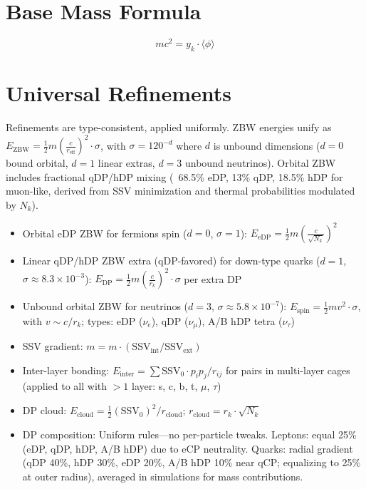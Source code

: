 \documentclass{article}
\begin{document}
\section{Base Mass Formula}

\[
m c^2 = y_k \cdot \langle\phi\rangle
\]

\section{Universal Refinements}

Refinements are type-consistent, applied uniformly. ZBW energies unify as $E_{\text{ZBW}} = \frac{1}{2} m \left( \frac{c}{r_{\text{eff}}} \right)^2 \cdot \sigma$, with $\sigma = 120^{-d}$ where $d$ is unbound dimensions ($d=0$ bound orbital, $d=1$ linear extras, $d=3$ unbound neutrinos). Orbital ZBW includes fractional qDP/hDP mixing (~68.5\% eDP, 13\% qDP, 18.5\% hDP for muon-like, derived from SSV minimization and thermal probabilities modulated by $N_k$).
\begin{itemize}
\item Orbital eDP ZBW for fermions spin ($d=0$, $\sigma=1$): $E_{\text{eDP}} = \frac{1}{2} m \left( \frac{c}{\sqrt{N_k}} \right)^2$
\item Linear qDP/hDP ZBW extra (qDP-favored) for down-type quarks ($d=1$, $\sigma \approx 8.3 \times 10^{-3}$): $E_{\text{DP}} = \frac{1}{2} m \left( \frac{c}{r_k} \right)^2 \cdot \sigma$ per extra DP
\item Unbound orbital ZBW for neutrinos ($d=3$, $\sigma \approx 5.8 \times 10^{-7}$): $E_{\text{spin}} = \frac{1}{2} m v^2 \cdot \sigma$, with $v \sim c / r_k$; types: eDP ($\nu_e$), qDP ($\nu_\mu$), A/B hDP tetra ($\nu_\tau$)
\item SSV gradient: $m = m \cdot (\text{SSV}_{\text{int}} / \text{SSV}_{\text{ext}})$
\item Inter-layer bonding: $E_{\text{inter}} = \sum \text{SSV}_0 \cdot p_i p_j / r_{ij}$ for pairs in multi-layer cages (applied to all with $>1$ layer: s, c, b, t, $\mu$, $\tau$)
\item DP cloud: $E_{\text{cloud}} = \frac{1}{2} (\text{SSV}_0)^2 / r_{\text{cloud}}$; $r_{\text{cloud}} = r_k \cdot \sqrt{N_k}$
\item DP composition: Uniform rules—no per-particle tweaks. Leptons: equal 25\% (eDP, qDP, hDP, A/B hDP) due to eCP neutrality. Quarks: radial gradient (qDP 40\%, hDP 30\%, eDP 20\%, A/B hDP 10\% near qCP; equalizing to 25\% at outer radius), averaged in simulations for mass contributions.
\end{itemize}
\end{document}
